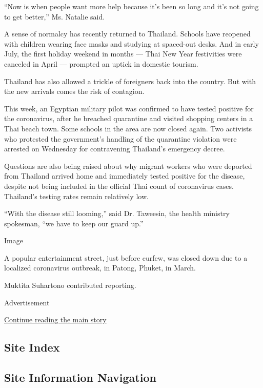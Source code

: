 ``Now is when people want more help because it's been so long and it's
not going to get better,'' Ms. Natalie said.

A sense of normalcy has recently returned to Thailand. Schools have
reopened with children wearing face masks and studying at spaced-out
desks. And in early July, the first holiday weekend in months --- Thai
New Year festivities were canceled in April --- prompted an uptick in
domestic tourism.

Thailand has also allowed a trickle of foreigners back into the country.
But with the new arrivals comes the risk of contagion.

This week, an Egyptian military pilot was confirmed to have tested
positive for the coronavirus, after he breached quarantine and visited
shopping centers in a Thai beach town. Some schools in the area are now
closed again. Two activists who protested the government's handling of
the quarantine violation were arrested on Wednesday for contravening
Thailand's emergency decree.

Questions are also being raised about why migrant workers who were
deported from Thailand arrived home and immediately tested positive for
the disease, despite not being included in the official Thai count of
coronavirus cases. Thailand's testing rates remain relatively low.

``With the disease still looming,'' said Dr. Taweesin, the health
ministry spokesman, ``we have to keep our guard up.''

Image

A popular entertainment street, just before curfew, was closed down due
to a localized coronavirus outbreak, in Patong, Phuket, in March.

Muktita Suhartono contributed reporting.

Advertisement

\protect\hyperlink{after-bottom}{Continue reading the main story}

\hypertarget{site-index}{%
\subsection{Site Index}\label{site-index}}

\hypertarget{site-information-navigation}{%
\subsection{Site Information
Navigation}\label{site-information-navigation}}

